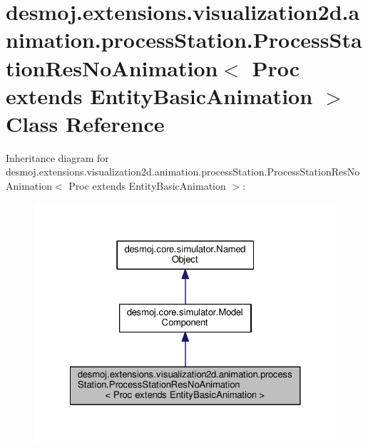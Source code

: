\section{desmoj.\-extensions.\-visualization2d.\-animation.\-process\-Station.\-Process\-Station\-Res\-No\-Animation$<$ Proc extends Entity\-Basic\-Animation $>$ Class Reference}
\label{classdesmoj_1_1extensions_1_1visualization2d_1_1animation_1_1process_station_1_1_process_station1b394a660a929ad0a3f8ca514517e8bd}


Inheritance diagram for desmoj.\-extensions.\-visualization2d.\-animation.\-process\-Station.\-Process\-Station\-Res\-No\-Animation$<$ Proc extends Entity\-Basic\-Animation $>$\-:
\nopagebreak
\begin{figure}[H]
\begin{center}
\leavevmode
\includegraphics[width=326pt]{classdesmoj_1_1extensions_1_1visualization2d_1_1animation_1_1process_station_1_1_process_stationbd3355dcf3a2fc0f7a84b4c4a39e5e43}
\end{center}
\end{figure}


